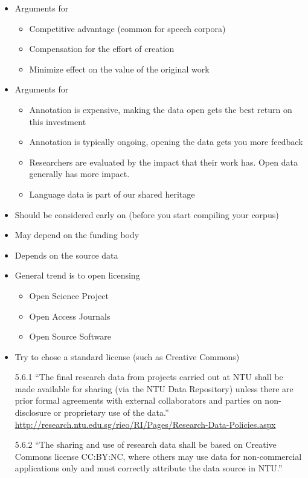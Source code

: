 \documentclass[a4paper,landscape,headrule,footrule,xetex]{foils}
\begin{document}
\MyLogo{}
\begin{itemize}
\item Arguments for 
  \begin{itemize}
  \item Competitive advantage (common for speech corpora)
  \item Compensation for the effort of creation
  \item Minimize effect on the value of the original work
  \end{itemize}
\item Arguments for 
  \begin{itemize}
  \item Annotation is expensive, making the data open gets the best
    return on this investment
  \item Annotation is typically ongoing, opening the data gets you
    more feedback
 \item Researchers are evaluated by the impact that their work has.
   Open data generally has more impact.
  \item Language data is part of our shared heritage
  \end{itemize}
\end{itemize}

\begin{itemize}
\item Should be considered early on (before you start compiling your corpus)
\item May depend on the funding body
\item Depends on the source data
\item General trend is to open licensing
  \begin{itemize}
  \item Open Science Project
  \item Open Access Journals
  \item Open Source Software
  \end{itemize}
\item Try to chose a standard license (such as Creative Commons)
\end{itemize}
\begin{itemize}
\item[5.6.1]  ``The final research data from projects carried out
  at NTU shall be made available for sharing (via the NTU Data
  Repository) unless there are prior formal agreements with external
  collaborators and parties on non-disclosure or proprietary use of
  the data.''  \url{http://research.ntu.edu.sg/rieo/RI/Pages/Research-Data-Policies.aspx}
\item[5.6.2]  ``The sharing and use of research data shall be based on Creative Commons license CC:BY:NC, where others may use data for non-commercial applications only and must correctly attribute the data source in NTU.''

\end{itemize}
\end{document}
